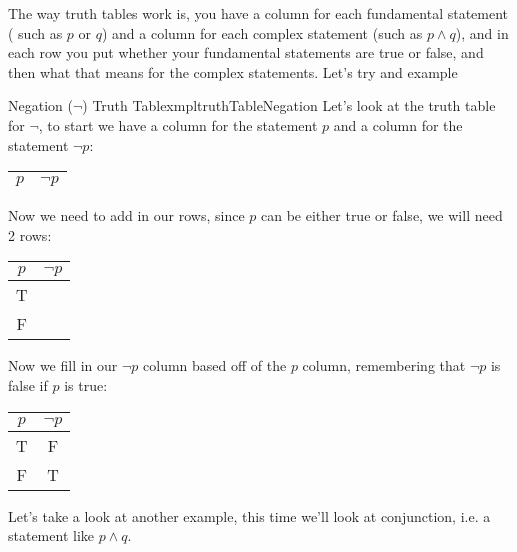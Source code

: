The way truth tables work is, you have a column for each fundamental statement ( such as $p$ or $q$) and a column for each complex statement (such as $p \land q$), and in each row you put whether your fundamental statements are true or false, and then what that means for the complex statements. Let's try and example

\begin{exmpl}[label={exmpl:truthTableNegation}]{Negation ($\lnot$) Truth Table}{xmpltruthTableNegation}
    Let's look at the truth table for $\lnot$, to start we have a column for the statement $p$ and a column for the statement $\lnot p$:
    \begin{center}
        \begin{tabular}{|c|c|}
            \hline
            $p$ & $\lnot p$ \\
            \hline
        \end{tabular}
    \end{center}
    Now we need to add in our rows, since $p$ can be either true or false, we will need 2 rows:
    \begin{center}
        \begin{tabular}{|c|c|}
            \hline
            $p$ & $\lnot p$ \\
            \hline
            T   &           \\
            \hline
            F   &           \\
            \hline
        \end{tabular}
    \end{center}
    Now we fill in our $\lnot p$ column based off of the $p$ column, remembering that $\lnot p$ is false if $p$ is true:
    \begin{center}
        \begin{tabular}{|c|c|}
            \hline
            $p$ & $\lnot p$ \\
            \hline
            T   & F         \\
            \hline
            F   & T         \\
            \hline
        \end{tabular}
    \end{center}
\end{exmpl}

Let's take a look at another example, this time we'll look at conjunction, i.e. a statement like $p \land q$.

